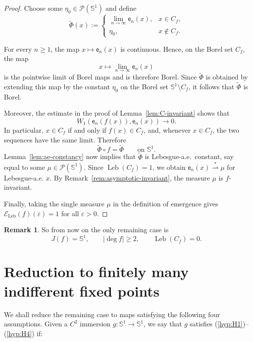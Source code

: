 \documentclass[12pt,a4paper,twoside]{article}
\theoremstyle{plain}
\theoremstyle{definition}
\newtheorem{remark}[theorem]{Remark}
\newcommand{\cP}{{\mathcal P}}
\newcommand{\eps}{\varepsilon}
\newcommand{\Leb}{\operatorname{Leb}}
\newcommand{\emp}{\mathsf e}
\newcommand{\Wone}{W_1}
\newcommand{\Sone}{\mathbb{S}^1}
\newcommand{\wto}{\overset{*}{\rightharpoonup}}
\begin{document}
	\begin{proof}
	Choose some $\eta_0\in\cP(\Sone)$ and define
	\[
	\widetilde\Phi(x):=
	\begin{cases}
		\displaystyle\lim_{n\to\infty}\emp_n(x), & x\in C_{f},\\
		\eta_0, & x\notin C_{f}.
	\end{cases}
	\]

	For every $n\ge1$, the map $x\mapsto\emp_n(x)$ is continuous. Hence, on the Borel set $C_{f}$, the map
	\[
	x\longmapsto\lim_{n\to\infty}\emp_n(x)
	\]
	is the pointwise limit of Borel maps and is therefore Borel. Since
	$\widetilde\Phi$ is obtained by extending this map by the constant
	$\eta_0$ on the Borel set $\Sone\setminus C_{f}$, it follows that
	$\widetilde\Phi$ is Borel.

	Moreover, the estimate in the proof of Lemma~\ref{lem:C-invariant} shows that
	\[
	\Wone(\emp_n(f(x)),\emp_n(x))\longrightarrow0.
	\]
	In particular, $x\in C_{f}$ if and only if $f(x)\in C_{f}$, and, whenever
	$x\in C_{f}$, the two sequences have the same limit. Therefore
	\[
	\widetilde\Phi\circ f=\widetilde\Phi
	\qquad\text{on }\Sone.
	\] 
    Lemma~\ref{lem:ae-constancy} now implies that $\widetilde\Phi$ is
	Lebesgue-a.e.\ constant, say equal to some $\mu\in\cP(\Sone)$. Since $\Leb(C_{f})=1$, we obtain $\emp_n(x)\wto\mu$ for Lebesgue-a.e. $x$. By Remark~\ref{rem:asymptotic-invariant}, the measure $\mu$ is $f$-invariant.

	Finally, taking the single measure $\mu$ in the definition of emergence gives $\mathcal E_{\Leb}(f)(\eps)=1$ for all $\eps>0$.
\end{proof}

	\begin{remark}
		So from now on the only remaining case is
		\[
		J(f)=\Sone,\qquad |\deg f|\ge2,\qquad \Leb(C_{f})=0.
		\]
	\end{remark}
	
	\section{Reduction to finitely many indifferent fixed points}

    We shall reduce the remaining case to maps satisfying the following four assumptions. Given a \(C^2\) immersion \(g:\Sone\to\Sone\), we say that \(g\) satisfies (\ref{hyp:H1})--(\ref{hyp:H4}) if:
\end{document}
